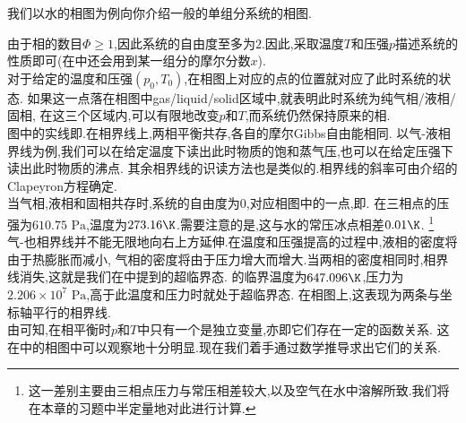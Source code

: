 \documentclass{ctexart}
\begin{document}
\vspace{8pt}
\indent 我们以水的相图为例向你介绍一般的单组分系统的相图.
\begin{figure}[H]
    \centering
\end{figure}
由于相的数目$\Phi\geqslant1$,因此系统的自由度至多为$2$.因此,采取温度$T$和压强$p$描述系统的性质即可(在中还会用到某一组分的摩尔分数$x$).\\
\indent 对于给定的温度和压强$\left(p_0,T_0\right)$,在相图上对应的点的位置就对应了此时系统的状态.%
如果这一点落在相图中gas/liquid/solid区域中,就表明此时系统为纯气相/液相/固相,%
在这三个区域内,可以有限地改变$p$和$T$,而系统仍然保持原来的相.\\
\indent 图中的实线即.在相界线上,两相平衡共存,各自的摩尔Gibbs自由能相同.%
以气-液相界线为例,我们可以在给定温度下读出此时物质的饱和蒸气压,也可以在给定压强下读出此时物质的沸点.%
其余相界线的识读方法也是类似的.相界线的斜率可由介绍的Clapeyron方程确定.\\
\indent 当气相,液相和固相共存时,系统的自由度为$0$,对应相图中的一点,即.%
在三相点的压强为$610.75\text{ Pa}$,温度为$273.16\K$.需要注意的是,这与水的常压冰点相差$0.01\K$.%
\footnote{这一差别主要由三相点压力与常压相差较大,以及空气在水中溶解所致.我们将在本章的习题中半定量地对此进行计算.}\\
\indent 气-也相界线并不能无限地向右上方延伸.在温度和压强提高的过程中,液相的密度将由于热膨胀而减小,%
气相的密度将由于压力增大而增大.当两相的密度相同时,相界线消失,这就是我们在中提到的超临界态.%
的临界温度为$647.096\K$,压力为$2.206\times10^7\text{ Pa}$,高于此温度和压力时就处于超临界态.%
在相图上,这表现为两条与坐标轴平行的相界线.\vspace{12pt}\\
\indent 由可知,在相平衡时$p$和$T$中只有一个是独立变量,亦即它们存在一定的函数关系.%
这在中的相图中可以观察地十分明显.现在我们着手通过数学推导求出它们的关系.
\end{document}
